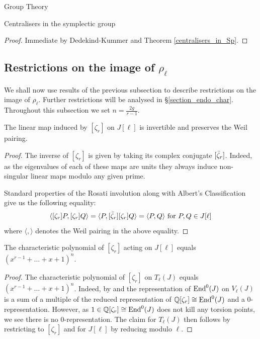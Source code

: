 \documentclass[11pt,a4paper]{article}
\newcommand{\zr}{\zeta_r}
\begin{document}
\begin{section}{Group Theory}
\begin{subsection}{Centralisers in the symplectic group}
\begin{proof}
Immediate by Dedekind-Kummer and Theorem \ref{centralisers_in_Sp}.
\end{proof}

\subsection{Restrictions on the image of $\rho_\ell$}
We shall now use results of the previous subsection to describe restrictions on the image of $\rho_\ell$.
Further restrictions will be analysed in \S \ref{section_endo_char}.
Throughout this subsection we set $n=\frac{2g}{r-1}$.

\begin{lemma}
\label{lemma_preserves_Weil_pairing}
    The linear map induced by $[\zeta_r]$ on $J[\ell]$ is invertible and preserves the Weil pairing.
\end{lemma}

\begin{proof}
    The inverse of $[\zeta_r]$ is given by taking its complex conjugate $[\Bar{\zeta}_r]$.
    Indeed, as the eigenvalues of each of these maps are units they always induce non-singular linear maps modulo any given prime.
    
    Standard properties of the Rosati involution 
\cite[pgs. 189, 192]{Mumford_ab_vars} along with Albert's Classification \cite[Thm. 2, pg. 201]{Mumford_ab_vars}
give us the following equality: \[\langle [\zr]P, [\zr]Q \rangle = \langle P, [\Bar{\zeta}_r][\zr]Q \rangle = \langle P,Q \rangle \text{ for $P,Q \in J[\ell]$}\]
where $\langle, \rangle$ denotes the Weil pairing in the above equality.
\end{proof}

\begin{lemma}
\label{lemma_char_poly}
    The characteristic polynomial of $[\zr]$ acting on $J[\ell]$ equals $( x^{r-1} + \ldots + x +
1 )^{n}$.
\end{lemma}

\begin{proof}
    The characteristic polynomial of $[\zr]$ on $T_\ell(J)$ equals $( x^{r-1} + \ldots + x +
1 )^{n}$.
Indeed, by \cite[Thm. 3.6]{Lang_CM} and \cite[\S5 Lemma 1, pg. 35]{Shimura_CM_book} the representation of $\End^0(J)$ on $V_\ell(J)$ is a sum of a multiple of the reduced representation of $\QQ[\zr] \cong \End^0(J)$ and a $0$-representation.
However, as $1 \in \QQ[\zr] \cong \End^0(J)$ does not kill any torsion points, we see there is no $0$-representation.
The claim for $T_\ell(J)$ then follows by restricting to $[\zr]$ and for $J[\ell]$ by reducing modulo $\ell$.
\end{proof}


\end{subsection}
\end{section}
\end{document}

